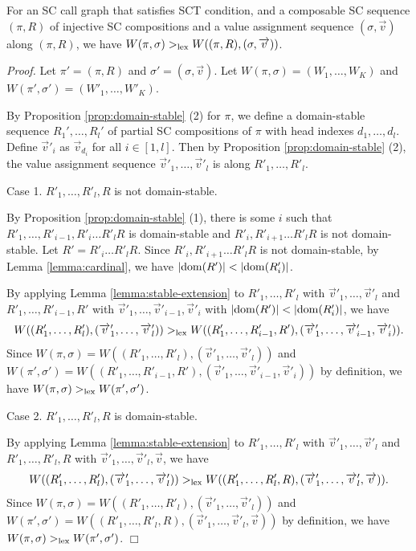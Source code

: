 \begin{Prop}\label{prop:decrease-pi}
For an SC call graph that satisfies SCT condition, and
a composable SC sequence $(\pi,R)$ of injective SC compositions and 
a value assignment sequence $(\sigma,\Vec v)$ along $(\pi,R)$,
we have $W(\pi,\sigma) >_{\rm lex} W((\pi,R),(\sigma,\overrightarrow v))$.
\end{Prop}

{\em Proof.}
Let
$\pi' = (\pi,R)$ and
$\sigma' = (\sigma,\Vec v)$.
Let $W(\pi,\sigma) = (W_1,\ldots,W_K)$ and
$W(\pi',\sigma') = (W'_1,\ldots,W'_K)$.

By Proposition \ref{prop:domain-stable} (2) for $\pi$, we define
a domain-stable sequence $R_1',\ldots,R_l'$ 
of partial SC compositions of $\pi$ with 
head indexes $d_1,\ldots,d_l$.
%
Define $\Vec v'_i$ as $\Vec v_{d_i}$ for all $i \in [1,l]$.
%
Then by Proposition \ref{prop:domain-stable} (2), 
the value assignment sequence $\Vec v'_1,\ldots,\Vec v'_l$ is
along $R'_1,\ldots,R'_l$.

Case 1. $R'_1,\ldots,R'_l,R$ is not domain-stable.

By Proposition \ref{prop:domain-stable} (1),
there is some $i$ such that $R'_1,\ldots,R'_{i-1},R'_i\ldots R'_lR$
is domain-stable and $R'_i,R'_{i+1}\ldots R'_lR$ is not domain-stable.
Let
$
R' = R'_i\ldots R'_lR.
$
Since $R'_i,R'_{i+1}\ldots R'_lR$ is not domain-stable,
by Lemma \ref{lemma:cardinal}, we have $|\dom(R')|<|\dom(R'_i)|$.

By applying Lemma \ref{lemma:stable-extension}
to $R'_1,\ldots,R'_l$ with $\Vec v'_1,\ldots,\Vec v'_l$ and
$R'_1,\ldots,R'_{i-1},R'$ with 
$\Vec v'_1,\ldots,\Vec v'_{i-1},\Vec v'_i$ with
$|\dom(R')|<|\dom(R'_i)|$,
we have
{\small
\[
W((R'_1,\ldots,R'_l),(\overrightarrow v'_1,\ldots,\overrightarrow v'_l)) >_{\rm lex}
W((R'_1,\ldots,R'_{i-1},R'),
(\overrightarrow v'_1,\ldots,\overrightarrow v'_{i-1},\overrightarrow v'_i)).
\]
}
Since
$
W(\pi,\sigma) = W((R'_1,\ldots,R'_l),(\Vec v'_1,\ldots,\Vec v'_l))
$ and
$
W(\pi',\sigma') = W((R'_1,\ldots,R'_{i-1},R'),
(\Vec v'_1,\ldots,\Vec v'_{i-1},\Vec v'_i))
$
by definition, we have 
$W(\pi,\sigma) >_{\rm lex} W(\pi',\sigma')$.

Case 2. $R'_1,\ldots,R'_l,R$ is domain-stable.

By applying Lemma \ref{lemma:stable-extension}
to $R'_1,\ldots,R'_{l}$ with $\Vec v'_1,\ldots,\Vec v'_l$ and
$R'_1,\ldots,R'_{l},R$ with $\Vec v'_1,\ldots,\Vec v'_l,\Vec v$,
we have
\[
W((R'_1,\ldots,R'_{l}), (\overrightarrow v'_1,\ldots,\overrightarrow v'_l)) >_{\rm lex}
W((R'_1,\ldots,R'_{l},R), (\overrightarrow v'_1,\ldots,\overrightarrow v'_l,\overrightarrow v)).
\]
Since
$
W(\pi,\sigma) = W((R'_1,\ldots,R'_{l}), (\Vec v'_1,\ldots,\Vec v'_l))
$
and
$
W(\pi',\sigma') = 
W((R'_1,\ldots,R'_{l},R), (\Vec v'_1,\ldots,\Vec v'_l,\Vec v))
$
by definition, we have 
$W(\pi,\sigma) >_{\rm lex} W(\pi',\sigma')$.
$\Box$

